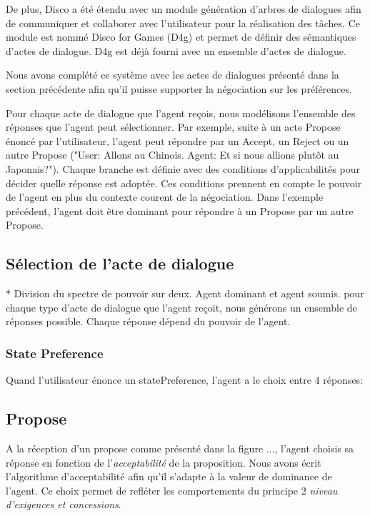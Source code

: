 	De plus, Disco a été étendu avec un module génération d'arbres de dialogues afin de communiquer et collaborer avec l'utilisateur pour la réalisation des tâches. Ce module est nommé Disco for Games (D4g) et permet de définir des sémantiques d'actes de dialogue. D4g est déjà fourni avec un ensemble d'actes de dialogue.
	
	Nous avons complété ce système avec les actes de dialogues présenté dans la section précédente afin qu'il puisse supporter la négociation sur les préférences.
	
	Pour chaque acte de dialogue que l'agent reçois, nous modélisons l'ensemble des réponses que l'agent peut sélectionner. Par exemple, suite à un acte Propose énoncé par l'utilisateur, l'agent peut répondre par un Accept, un Reject ou un autre Propose ("User: Allons au Chinois. Agent: Et si nous allions plutôt au Japonais?"). 
	Chaque branche est définie avec des conditions d'applicabilités pour décider quelle réponse est adoptée. 
	Ces conditions prennent en compte le pouvoir de l'agent en plus du contexte courent de la négociation. Dans l'exemple précédent, l'agent doit être dominant pour répondre à un Propose par un autre Propose. 
	
	

	
	\subsection{Sélection de l'acte de dialogue}*
		Division du spectre de pouvoir sur deux. Agent dominant et agent soumis.
		pour chaque type d'acte de dialogue que l'agent reçoit, nous générons un ensemble de réponses possible. Chaque réponse dépend du pouvoir de l'agent.
		
		\subsubsection{State Preference}
			Quand l'utilisateur énonce un statePreference, l'agent a le choix entre 4 réponses:
			
		\subsection{Propose}
			A la réception d'un propose comme présenté dans la figure ..., l'agent choisis sa réponse en fonction de l'\emph{acceptabilité} de la proposition.
			Nous avons écrit l'algorithme d'acceptabilité afin qu'il s'adapte à la valeur de dominance de l'agent. Ce choix permet de refléter les comportements du principe 2 \emph{niveau d'exigences et concessions}.
			
